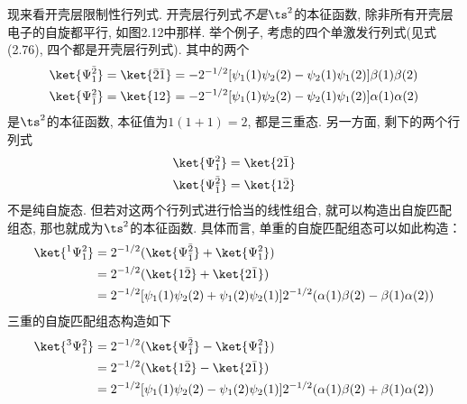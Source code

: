 现来看开壳层限制性行列式. 
开壳层行列式\emph{不是}$\ts^2$的本征函数, 
除非所有开壳层电子的自旋都平行, 
如图2.12中那样. 
举个例子, 
考虑的四个单激发行列式(见式(2.76), 
四个都是开壳层行列式). 
其中的两个
\begin{subequations}
	\begin{align}
	\ket{\Psi_1^{\bar{2}}} & = \ket{\bar{2}\bar{1}} = -2^{-1/2}[\psi_1(1)\psi_2(2) - \psi_2(1)\psi_1(2)]\beta(1)\beta(2)\\
	\ket{\Psi_{\bar{1}}^2} & = \ket{12}  = -2^{-1/2}[\psi_1(1)\psi_2(2) - \psi_2(1)\psi_1(2)]\alpha(1)\alpha(2)
	\end{align}
\end{subequations} 
是$\ts^2$的本征函数, 
本征值为$1(1+1)=2$, 
都是三重态. 
另一方面, 
剩下的两个行列式
\begin{subequations}
	\begin{align}
	\ket{\Psi_1^2} & = \ket{2\bar{1}}\\
	\ket{\Psi_{\bar{1}}^{\bar{2}}} & = \ket{1\bar{2}}
	\end{align}
\end{subequations} 
不是纯自旋态. 
但若对这两个行列式进行恰当的线性组合, 
就可以构造出自旋匹配组态, 
那也就成为$\ts^2$的本征函数. 
具体而言, 
单重的自旋匹配组态可以如此构造：
\begin{align}
\ket{^1\Psi_1^2} & = 2^{-1/2}(\ket{\Psi_{\bar{1}}^{\bar{2}}} + \ket{\Psi_1^2}) \notag\\
& =2^{-1/2}(\ket{1\bar{2}} + \ket{2\bar{1}})\notag \\
	& =2^{-1/2}[ \psi_1(1)\psi_2(2) + \psi_1(2)\psi_2(1)] 2^{-1/2}(\alpha(1)\beta(2) - \beta(1)\alpha(2)) \label{eq:2.260}
\end{align}
三重的自旋匹配组态构造如下
\begin{align}
\ket{^3\Psi_1^2} & = 2^{-1/2}(\ket{\Psi_{\bar{1}}^{\bar{2}}} - \ket{\Psi_1^2}) \notag\\
& =2^{-1/2}(\ket{1\bar{2}} - \ket{2\bar{1}})\notag \\
& =2^{-1/2}[ \psi_1(1)\psi_2(2) - \psi_1(2)\psi_2(1)] 2^{-1/2}(\alpha(1)\beta(2) + \beta(1)\alpha(2))
\end{align}

